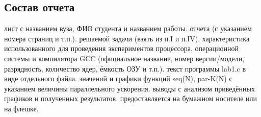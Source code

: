 { %
	\subsection{Состав отчета}
	\Large
	\begin{enumerate}
		 лист с названием вуза, ФИО студента и названием работы.
		 отчета (с указанием номера страниц и т.п.).
		 решаемой задачи (взять из п.I и п.IV).
		 характеристика использованного для проведения экспериментов процессора, операционной системы и компилятора GCC (официальное название, номер версии/модели, разрядность, количество ядер, ёмкость ОЗУ и т.п.).
		 текст программы lab1.c в виде отдельного файла.
		 значений и графики функций seq(N), par-K(N) с указанием величины параллельного ускорения.
		 выводы с анализом приведённых графиков и полученных результатов.
		 предоставляется на бумажном носителе или на флешке.
	\end{enumerate}
}